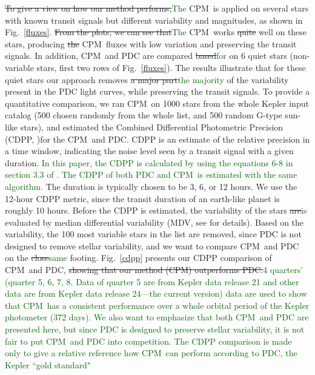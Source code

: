 \documentclass[12pt, preprint]{aastex}
\newcommand{\name}{CPM}
\newcommand{\revise}[1]{\textcolor{darkgreen}{#1}}
\newcommand{\remove}[1]{\sout{#1}}
\begin{document}
\remove{To give a view on how our method performs,}\revise{The} \name\ is applied on several stars with known transit signals but different variability and magnitudes, as shown in Fig.~\ref{fluxes}. 
\remove{From the plots, we can see that}\revise{The} \name\ works \remove{quite} well on these stars, producing \remove{the} \name\ fluxes 
with low variation and preserving the transit signals.
In addition, \name\ and PDC are compared \remove{based}\revise{for} on 6 quiet stars 
(non-variable stars, first two rows of Fig.~\ref{fluxes}). 
The results illustrate that for these quiet stars our approach removes 
\remove{a major part}\revise{the majority} of the variability present in the PDC light curves, while preserving the transit signals. 
To provide a quantitative comparison, we ran \name\ on 1000 stars from the whole Kepler input catalog 
(500 chosen randomly from the whole list, and 500 random G-type sun-like stars), 
and estimated the Combined Differential Photometric Precision (CDPP,  \citealt{cdpp1} )for the \name\ and PDC.  
CDPP is an estimate of the relative precision in a time window, 
indicating the noise level seen by a transit signal with a given duration. 
\revise{In this paper, the CDPP is calculated by using the equations 6-8 in section 3.3 of \citealt{cdpp1}. The CDPP of both PDC and \name\ is estimated with the same algorithm.} 
The duration is typically chosen to be 3, 6, or 12 hours. 
We use the 12-hour CDPP metric, since the transit duration of an earth-like planet is roughly 10 hours. 
Before the CDPP is estimated, the variability of the stars \remove{are}\revise{is} evaluated by median differential variability 
  (MDV, see \citealt{basri2013} for details). 
Based on the variability, the 100 most variable stars in the list are removed, 
  since PDC is not designed to remove stellar variability, 
  and we want to compare \name\ and PDC on the \remove{close}\revise{same} footing.
Fig.~\ref{cdpp} presents our CDPP comparison of \name\ and PDC, 
  \remove{showing that our method (\name) outperforms PDC.}\revise{4 quarters' (quarter 5, 6, 7, 8. Data of quarter 5 are from Kepler data release 21 and other data are from Kepler data release 24---the current version) data are used to show that \name\ has a consistent performance over a whole orbital period of the Kepler photometer (372 days). We also want to emphasize that both \name\ and PDC are presented here, but since PDC is designed to preserve stellar variability, it is not fair to put \name\ and PDC into competition. The CDPP comparison is made only to give a relative reference how \name\ can perform according to PDC, the Kepler ``gold standard"}
\end{document}
